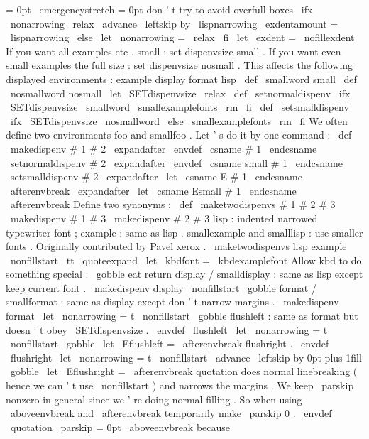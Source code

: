 {{{=
0pt
\
emergencystretch
=
0pt
%
don
'
t
try
to
avoid
overfull
boxes
\
ifx
\
nonarrowing
\
relax
\
advance
\
leftskip
by
\
lispnarrowing
\
exdentamount
=
\
lispnarrowing
\
else
\
let
\
nonarrowing
=
\
relax
\
fi
\
let
\
exdent
=
\
nofillexdent
}
%
If
you
want
all
examples
etc
.
small
:
set
dispenvsize
small
.
%
If
you
want
even
small
examples
the
full
size
:
set
dispenvsize
nosmall
.
%
This
affects
the
following
displayed
environments
:
%
example
display
format
lisp
%
\
def
\
smallword
{
small
}
\
def
\
nosmallword
{
nosmall
}
\
let
\
SETdispenvsize
\
relax
\
def
\
setnormaldispenv
{
%
\
ifx
\
SETdispenvsize
\
smallword
\
smallexamplefonts
\
rm
\
fi
}
\
def
\
setsmalldispenv
{
%
\
ifx
\
SETdispenvsize
\
nosmallword
\
else
\
smallexamplefonts
\
rm
\
fi
}
%
We
often
define
two
environments
foo
and
smallfoo
.
%
Let
'
s
do
it
by
one
command
:
\
def
\
makedispenv
#
1
#
2
{
\
expandafter
\
envdef
\
csname
#
1
\
endcsname
{
\
setnormaldispenv
#
2
}
\
expandafter
\
envdef
\
csname
small
#
1
\
endcsname
{
\
setsmalldispenv
#
2
}
\
expandafter
\
let
\
csname
E
#
1
\
endcsname
\
afterenvbreak
\
expandafter
\
let
\
csname
Esmall
#
1
\
endcsname
\
afterenvbreak
}
%
Define
two
synonyms
:
\
def
\
maketwodispenvs
#
1
#
2
#
3
{
\
makedispenv
{
#
1
}
{
#
3
}
\
makedispenv
{
#
2
}
{
#
3
}
}
%
lisp
:
indented
narrowed
typewriter
font
;
example
:
same
as
lisp
.
%
%
smallexample
and
smalllisp
:
use
smaller
fonts
.
%
Originally
contributed
by
Pavel
xerox
.
%
\
maketwodispenvs
{
lisp
}
{
example
}
{
%
\
nonfillstart
\
tt
\
quoteexpand
\
let
\
kbdfont
=
\
kbdexamplefont
%
Allow
kbd
to
do
something
special
.
\
gobble
%
eat
return
}
%
display
/
smalldisplay
:
same
as
lisp
except
keep
current
font
.
%
\
makedispenv
{
display
}
{
%
\
nonfillstart
\
gobble
}
%
format
/
smallformat
:
same
as
display
except
don
'
t
narrow
margins
.
%
\
makedispenv
{
format
}
{
%
\
let
\
nonarrowing
=
t
%
\
nonfillstart
\
gobble
}
%
flushleft
:
same
as
format
but
doesn
'
t
obey
\
SETdispenvsize
.
\
envdef
\
flushleft
{
%
\
let
\
nonarrowing
=
t
%
\
nonfillstart
\
gobble
}
\
let
\
Eflushleft
=
\
afterenvbreak
%
flushright
.
%
\
envdef
\
flushright
{
%
\
let
\
nonarrowing
=
t
%
\
nonfillstart
\
advance
\
leftskip
by
0pt
plus
1fill
\
gobble
}
\
let
\
Eflushright
=
\
afterenvbreak
%
quotation
does
normal
linebreaking
(
hence
we
can
'
t
use
\
nonfillstart
)
%
and
narrows
the
margins
.
We
keep
\
parskip
nonzero
in
general
since
%
we
'
re
doing
normal
filling
.
So
when
using
\
aboveenvbreak
and
%
\
afterenvbreak
temporarily
make
\
parskip
0
.
%
\
envdef
\
quotation
{
%
{
\
parskip
=
0pt
\
aboveenvbreak
}
%
because
}}}
